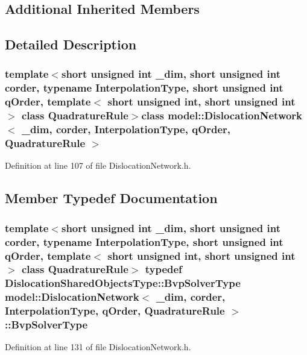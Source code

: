 \subsection*{Additional Inherited Members}


\subsection{Detailed Description}
\subsubsection*{template$<$short unsigned int \+\_\+dim, short unsigned int corder, typename Interpolation\+Type, short unsigned int q\+Order, template$<$ short unsigned int, short unsigned int $>$ class Quadrature\+Rule$>$class model\+::\+Dislocation\+Network$<$ \+\_\+dim, corder, Interpolation\+Type, q\+Order, Quadrature\+Rule $>$}



Definition at line 107 of file Dislocation\+Network.\+h.



\subsection{Member Typedef Documentation}
\hypertarget{classmodel_1_1_dislocation_network_acecaeb744bb1ab8bdefdcd85d330ae86}{}
\subsubsection[{Bvp\+Solver\+Type}]{\setlength{\rightskip}{0pt plus 5cm}template$<$short unsigned int \+\_\+dim, short unsigned int corder, typename Interpolation\+Type, short unsigned int q\+Order, template$<$ short unsigned int, short unsigned int $>$ class Quadrature\+Rule$>$ typedef {\bf Dislocation\+Shared\+Objects\+Type\+::\+Bvp\+Solver\+Type} {\bf model\+::\+Dislocation\+Network}$<$ \+\_\+dim, corder, Interpolation\+Type, q\+Order, Quadrature\+Rule $>$\+::{\bf Bvp\+Solver\+Type}}\label{classmodel_1_1_dislocation_network_acecaeb744bb1ab8bdefdcd85d330ae86}


Definition at line 131 of file Dislocation\+Network.\+h.

\hypertarget{classmodel_1_1_dislocation_network_a9c684e15a7dbae0ab13dbfdb5c76e81c}{}
